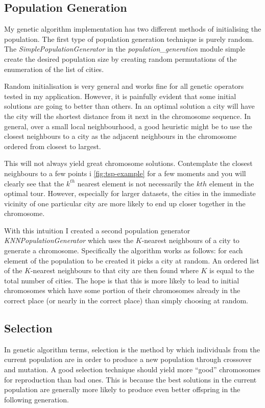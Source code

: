 \documentclass[journal]{IEEEtran}
\begin{document}
\subsection{Population Generation}
My genetic algorithm implementation has two different methods of initialising the population. The first type of population generation technique is purely random. The \textit{SimplePopulationGenerator} in the \textit{population\_generation} module simple create the desired population size by creating random permutations of the enumeration of the list of cities. 

Random initialisation is very general and works fine for all genetic operators tested in my application. However, it is painfully evident that some initial solutions are going to better than others. In an optimal solution a city will have the city will the shortest distance from it next in the chromosome sequence. In general, over a small local neighbourhood, a good heuristic might be to use the closest neighbours to a city as the adjacent neighbours in the chromosome ordered from closest to largest. 

This will not always yield great chromosome solutions. Contemplate the closest neighbours to a few points i \ref{fig:tsp-example} for a few moments and you will clearly see that the $k^{th}$ nearest element is not necessarily the $k{th}$ element in the optimal tour. However, especially for larger datasets, the cities in the immediate vicinity of one particular city are more likely to end up closer together in the chromosome.

With this intuition I created a second population generator \textit{KNNPopulationGenerator} which uses the $K$-nearest neighbours of a city to generate a chromosome. Specifically the algorithm works as follows: for each element of the population to be created it picks a city at random. An ordered list of the $K$-nearest neighbours to that city are then found where $K$ is equal to the total number of cities. The hope is that this is more likely to lead to initial chromosomes which have some portion of their chromosomes already in the correct place (or nearly in the correct place) than simply choosing at random. 

\subsection{Selection}
In genetic algorithm terms, selection is the method by which individuals from the current population are in order to produce a new population through crossover and mutation. A good selection technique should yield more ``good'' chromosomes for reproduction than bad ones. This is because the best solutions in the current population are generally more likely to produce even better offspring in the following generation. 
\end{document}
